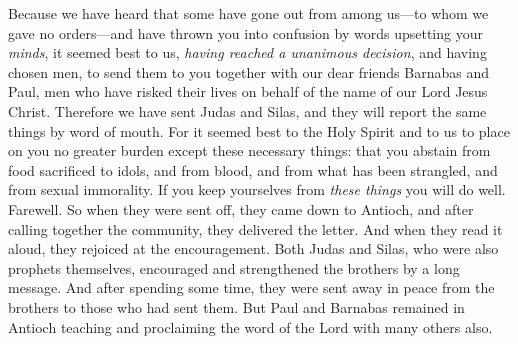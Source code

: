 \begin{biblechapter}
\verse Because we have heard that some have gone out from among us—to whom we gave no orders—and have thrown you into confusion by words upsetting your \textit{minds},
\verse it seemed best to us, \textit{having reached a unanimous decision}, and having chosen men, to send them to you together with our dear friends Barnabas and Paul,
\verse men who have risked their lives on behalf of the name of our Lord Jesus Christ.
\verse Therefore we have sent Judas and Silas, and they will report the same things by word of mouth.
\verse For it seemed best to the Holy Spirit and to us to place on you no greater burden except these necessary things:
\verse that you abstain from food sacrificed to idols, and from blood, and from what has been strangled, and from sexual immorality. If you keep yourselves from \textit{these things} you will do well. Farewell.
 So when they were sent off, they came down to Antioch, and after calling together the community, they delivered the letter.
\verse And when they read it aloud, they rejoiced at the encouragement.
\verse Both Judas and Silas, who were also prophets themselves, encouraged and strengthened the brothers by a long message.
\verse And after spending some time, they were sent away in peace from the brothers to those who had sent them.
\verse But Paul and Barnabas remained in Antioch teaching and proclaiming the word of the Lord with many others also.

\end{biblechapter}
